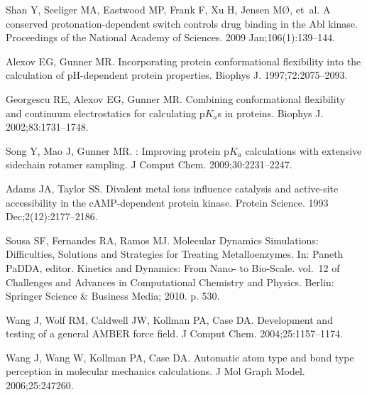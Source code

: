 \documentclass[10pt,letterpaper]{article}
\begin{document}
\begin{thebibliography}{100}
Shan Y, Seeliger MA, Eastwood MP, Frank F, Xu H, Jensen M{\O}, et~al.
\newblock A conserved protonation-dependent switch controls drug binding in the
  {Abl} kinase.
\newblock Proceedings of the National Academy of Sciences. 2009
  Jan;106(1):139--144.

Alexov EG, Gunner MR.
\newblock Incorporating protein conformational flexibility into the calculation
  of {pH}-dependent protein properties.
\newblock Biophys J. 1997;72:2075--2093.

Georgescu RE, Alexov EG, Gunner MR.
\newblock Combining conformational flexibility and continuum electrostatics for
  calculating p$K_a$s in proteins.
\newblock Biophys J. 2002;83:1731--1748.

Song Y, Mao J, Gunner MR.
: Improving protein p$K_a$ calculations with extensive
  sidechain rotamer sampling.
\newblock J Comput Chem. 2009;30:2231--2247.

Adams JA, Taylor SS.
\newblock Divalent metal ions influence catalysis and active-site accessibility
  in the {cAMP}-dependent protein kinase.
\newblock Protein Science. 1993 Dec;2(12):2177--2186.

Sousa SF, Fernandes RA, Ramos MJ.
\newblock Molecular {Dynamics} {Simulations}: {Difficulties}, {Solutions} and
  {Strategies} for {Treating} {Metalloenzymes}.
\newblock In: Paneth PaDDA, editor. Kinetics and {Dynamics}: {From} {Nano}- to
  {Bio}-{Scale}. vol.~12 of Challenges and {Advances} in {Computational}
  {Chemistry} and {Physics}. Berlin: Springer Science \& Business Media; 2010.
  p. 530.

Wang J, Wolf RM, Caldwell JW, Kollman PA, Case DA.
\newblock Development and testing of a general {AMBER} force field.
\newblock J Comput Chem. 2004;25:1157--1174.

Wang J, Wang W, Kollman PA, Case DA.
\newblock Automatic atom type and bond type perception in molecular mechanics
  calculations.
\newblock J Mol Graph Model. 2006;25:247260.

\end{thebibliography}
\end{document}
